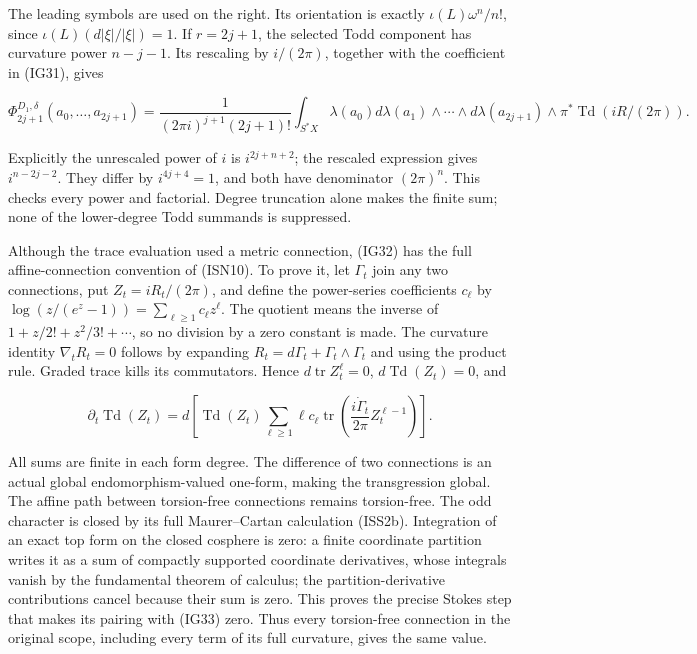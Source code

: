 \documentclass[
  11pt,
]{article}
\newcounter{none} %
\begin{document}
The leading symbols are used on the right. Its orientation is exactly
\(\iota(L)\omega^n/n!\), since \(\iota(L)(d|\xi|/|\xi|)=1\). If
\(r=2j+1\), the selected Todd component has curvature power \(n-j-1\).
Its rescaling by \(i/(2\pi)\), together with the coefficient in (IG31),
gives

\[
 \Phi_{2j+1}^{D_1,\delta}(a_0,\ldots,a_{2j+1})=
 \frac1{(2\pi i)^{j+1}(2j+1)!}
 \int_{S^*X}\lambda(a_0)d\lambda(a_1)\wedge\cdots
             \wedge d\lambda(a_{2j+1})
             \wedge\pi^*\operatorname{Td}(iR/(2\pi)).
\tag{IG32}
\]

Explicitly the unrescaled power of \(i\) is \(i^{2j+n+2}\); the rescaled
expression gives \(i^{n-2j-2}\). They differ by \(i^{4j+4}=1\), and both
have denominator \((2\pi)^n\). This checks every power and factorial.
Degree truncation alone makes the finite sum; none of the lower-degree
Todd summands is suppressed.

Although the trace evaluation used a metric connection, (IG32) has the
full affine-connection convention of (ISN10). To prove it, let
\(\Gamma_t\) join any two connections, put \(Z_t=iR_t/(2\pi)\), and
define the power-series coefficients \(c_\ell\) by
\(\log(z/(e^z-1))=\sum_{\ell\geq1}c_\ell z^\ell\). The quotient means
the inverse of \(1+z/2!+z^2/3!+\cdots\), so no division by a zero
constant is made. The curvature identity \(\nabla_tR_t=0\) follows by
expanding \(R_t=d\Gamma_t+\Gamma_t\wedge\Gamma_t\) and using the product
rule. Graded trace kills its commutators. Hence
\(d\operatorname{tr}Z_t^\ell=0\), \(d\operatorname{Td}(Z_t)=0\), and

\[
 \partial_t\operatorname{Td}(Z_t)=d\left[
   \operatorname{Td}(Z_t)
   \sum_{\ell\geq1}\ell c_\ell
    \operatorname{tr}\!\left(
      \frac{i\dot\Gamma_t}{2\pi}Z_t^{\ell-1}\right)\right].
\tag{IG33}
\]

All sums are finite in each form degree. The difference of two
connections is an actual global endomorphism-valued one-form, making the
transgression global. The affine path between torsion-free connections
remains torsion-free. The odd character is closed by its full
Maurer--Cartan calculation (ISS2b). Integration of an exact top form on
the closed cosphere is zero: a finite coordinate partition writes it as
a sum of compactly supported coordinate derivatives, whose integrals
vanish by the fundamental theorem of calculus; the partition-derivative
contributions cancel because their sum is zero. This proves the precise
Stokes step that makes its pairing with (IG33) zero. Thus every
torsion-free connection in the original scope, including every term of
its full curvature, gives the same value.
\end{document}
